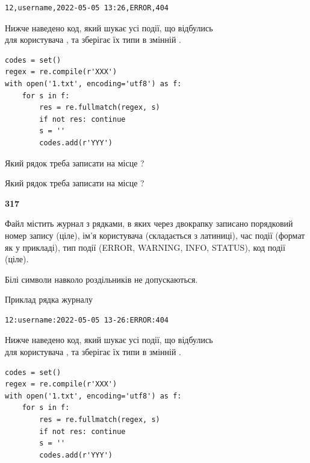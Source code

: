 \begin{verbatim}
12,username,2022-05-05 13:26,ERROR,404
\end{verbatim}


Нижче наведено код, який шукає усі події, що відбулись\\ для користувача , та зберігає їх типи в змінній .



\begin{verbatim}
codes = set()
regex = re.compile(r'XXX')
with open('1.txt', encoding='utf8') as f:
    for s in f:
        res = re.fullmatch(regex, s)
        if not res: continue
        s = ''
        codes.add(r'YYY')
\end{verbatim}





Який рядок треба записати на місце  ?\par
\vspace{5mm}


Який рядок треба записати на місце  ?\par


\newpage

{\begin {center}\textbf{ 317}\end {center}}\par
Файл  містить журнал з рядками, в яких через двокрапку записано поряд\-ко\-вий номер запису (ціле), ім'я користувача (складається з латиниці), час події (фор\-мат як у прикладі), тип події (ERROR, WARNING, INFO, STATUS), код події (ціле).

Білі символи навколо роздільників не допускаються.

Приклад рядка журналу



\begin{verbatim}
12:username:2022-05-05 13-26:ERROR:404
\end{verbatim}


Нижче наведено код, який шукає усі події, що відбулись\\ для користувача , та зберігає їх типи в змінній .



\begin{verbatim}
codes = set()
regex = re.compile(r'XXX')
with open('1.txt', encoding='utf8') as f:
    for s in f:
        res = re.fullmatch(regex, s)
        if not res: continue
        s = ''
        codes.add(r'YYY')
\end{verbatim}





